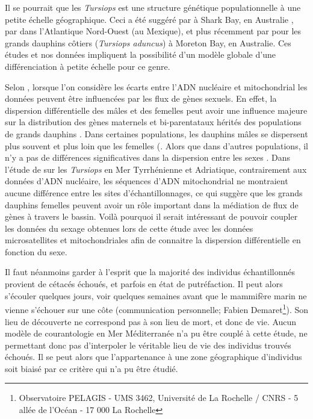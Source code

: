 \documentclass[a4paper,12pt,twoside]{article}\usepackage[]{graphicx}\usepackage[]{color}
\begin{document}
Il se pourrait que les \emph{Tursiops} est une structure génétique populationnelle à une petite échelle géographique. Ceci a été suggéré par \citep{krutzen2004population} à Shark Bay, en Australie , par \citep{sellas2005mitochondrial} dans l'Atlantique Nord-Ouest (au Mexique), et plus récemment par \citep{ansmann2012dolphins} pour les grands dauphins côtiers (\emph{Tursiops aduncus}) à Moreton Bay, en Australie. Ces études et nos données impliquent la possibilité d'un modèle globale d'une différenciation à petite échelle pour ce genre.

Selon \citet{gaspari2015population}, lorsque l'on considère les écarts entre l'ADN nucléaire et mitochondrial les données peuvent être influencées par les flux de gènes sexuels. En effet, la dispersion différentielle des mâles et des femelles peut avoir une influence majeure sur la distribution des gènes maternels et bi-parentataux hérités des populations de grands dauphins \citep{hoelzel1998genetic}. Dans certaines populations, les dauphins mâles se dispersent plus souvent et plus loin que les femelles (\citep{krutzen2004population, moller2004genetic}. Alors que dans d'autres populations, il n'y a pas de différences significatives dans la dispersion entre les sexes \citep{natoli2005habitat}. Dans l'étude de \citet{gaspari2015population} sur les \emph{Tursiops} en Mer Tyrrhénienne et Adriatique, contrairement aux données d'ADN nucléaire, les séquences d'ADN mitochondrial ne montraient aucune différence entre les sites d'échantillonnages, ce qui suggère que les grands dauphins femelles peuvent avoir un rôle important dans la médiation de flux de gènes à travers le bassin. Voilà pourquoi il serait intéressant de pouvoir coupler les données du sexage obtenues lors de cette étude avec les données microsatellites et mitochondriales afin de connaitre la dispersion différentielle en fonction du sexe.

Il faut néanmoins garder à l'esprit que la majorité des individus échantillonnés provient de cétacés échoués, et parfois en état de putréfaction. Il peut alors s'écouler quelques jours, voir quelques semaines avant que le mammifère marin ne vienne s'échouer sur une côte (communication personnelle; Fabien Demaret\footnote{Observatoire PELAGIS - UMS 3462, Université de La Rochelle / CNRS - 5 allée de l’Océan - 17 000 La Rochelle}). Son lieu de découverte ne correspond pas à son lieu de mort, et donc de vie. Aucun modèle de courantologie en Mer Méditerranée n'a pu être couplé à cette étude, ne permettant donc pas d'interpoler le véritable lieu de vie des individus trouvés échoués. Il se peut alors que l'appartenance à une zone géographique d'individus soit biaisé par ce critère qui n'a pu être étudié.
\end{document}
